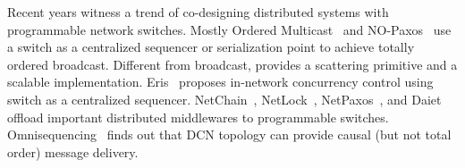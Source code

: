 Recent years witness a trend of co-designing distributed systems with programmable network switches.
Mostly Ordered Multicast~\cite{ports2015designing} and NO-Paxos~\cite{li2016just} use a switch as a centralized sequencer or serialization point to achieve totally ordered broadcast.
Different from broadcast, \sys{} provides a scattering primitive and a scalable implementation.
Eris~\cite{eris} proposes in-network concurrency control using switch as a centralized sequencer.
NetChain~\cite{jin2018netchain}, NetLock~\cite{yu2020netlock}, NetPaxos~\cite{dang2015netpaxos}, and Daiet~\cite{sapio2017network} offload important distributed middlewares to programmable switches.
Omnisequencing~\cite{michael2018towards} finds out that DCN topology can provide causal (but not total order) message delivery.









